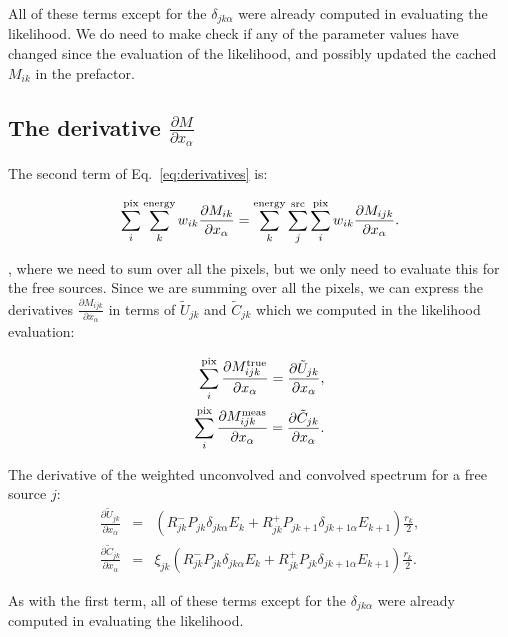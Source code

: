 \documentclass[preprint]{aastex}
\begin{document}
\noindent All of these terms except for the $\delta_{jk\alpha}$ were
already computed in evaluating the likelihood.  We do need to make
check if any of the parameter values have changed since the evaluation
of the likelihood, and possibly updated the cached $M_{ik}$ in the 
prefactor. 

\subsection{The derivative \texorpdfstring{$\frac{\partial M}{\partial x_{\alpha}}$}{dM/dx}}\label{subsec:derivatives_part2}

The second term of Eq.~\ref{eq:derivatives} is:

\begin{equation}
  \sum_i^{\rm pix} \sum_k^{\rm energy} w_{ik}\frac{\partial M_{ik}}{\partial x_{\alpha}} = 
  \sum_k^{\rm energy} \sum_j^{\rm src} \sum_i^{\rm pix} w_{ik} \frac{\partial M_{ijk}}{\partial x_{\alpha}}.
\end{equation}

\noindent, where we need to sum over all the pixels, but we only need
to evaluate this for the free sources.  Since we are summing over all
the pixels, we can express the derivatives $\frac{\partial
  M_{ijk}}{\partial x_{\alpha}}$ in terms of $\tilde{U}_{jk}$ and
$\tilde{C}_{jk}$ which we computed in the likelihood evaluation:

\begin{eqnarray}
  \sum_i^{\rm pix} \frac{\partial M_{ijk}^{\rm true}}{\partial x_{\alpha}} = \frac{\partial\tilde{U}_{jk}}{\partial x_{\alpha}}, \nonumber \\
  \sum_i^{\rm pix} \frac{\partial M_{ijk}^{\rm meas}}{\partial x_{\alpha}} = \frac{\partial\tilde{C}_{jk}}{\partial x_{\alpha}}.  
\end{eqnarray}


The derivative of the weighted unconvolved and convolved spectrum for
a free source $j$:
\begin{eqnarray}
  \frac{\partial\tilde{U}_{jk}}{\partial x_{\alpha}} & = & ( R_{jk}^{-} P_{jk} \delta_{jk\alpha} E_k + R_{jk}^{+} P_{jk+1} \delta_{jk+1\alpha} E_{k+1} )  \frac{r_k}{2}, \nonumber \\
  \frac{\partial\tilde{C}_{jk}}{\partial x_{\alpha}} & = & \xi_{jk} ( R_{jk}^{-}  P_{jk} \delta_{jk\alpha} E_k + R_{jk}^{+} P_{jk} \delta_{jk+1\alpha} E_{k+1} ) \frac{r_k}{2}.
\end{eqnarray}

As with the first term, all of these terms except for the
$\delta_{jk\alpha}$ were already computed in evaluating the
likelihood.
\end{document}
